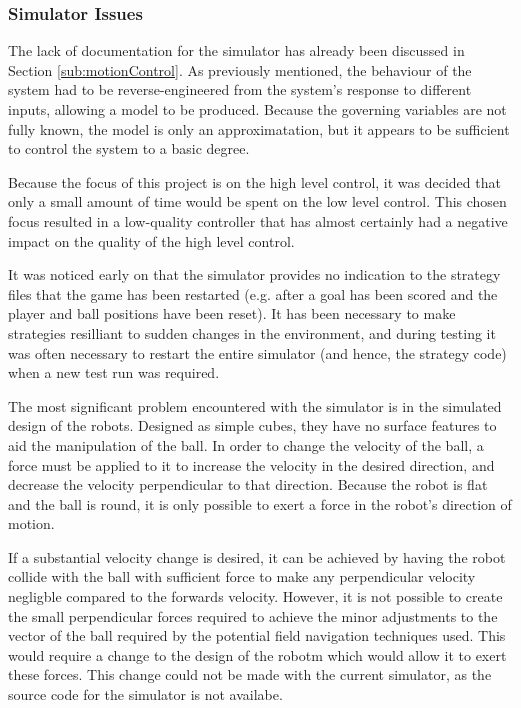 \documentclass[10pt]{article}
\begin{document}
\subsubsection{Simulator Issues\label{sub:simulatorIssues}}

The lack of documentation for the simulator has already been discussed in
Section \ref{sub:motionControl}.  As previously mentioned, the behaviour of the
system had to be reverse-engineered from the system's response to different
inputs, allowing a model to be produced.  Because the governing variables are
not fully known, the model is only an approximatation, but it appears to be
sufficient to control the system to a basic degree.

Because the focus of this project is on the high level control, it was decided
that only a small amount of time would be spent on the low level control.  This
chosen focus resulted in a low-quality controller that has almost certainly had
a negative impact on the quality of the high level control.

It was noticed early on that the simulator provides no indication to the
strategy files that the game has been restarted (e.g. after a goal has been
scored and the player and ball positions have been reset).  It has been
necessary to make strategies resilliant to sudden changes in the environment,
and during testing it was often necessary to restart the entire simulator (and
hence, the strategy code) when a new test run was required.

The most significant problem encountered with the simulator is in the simulated
design of the robots.  Designed as simple cubes, they have no surface features
to aid the manipulation of the ball.  In order to change the velocity of the
ball, a force must be applied to it to increase the velocity in the desired
direction, and decrease the velocity perpendicular to that direction.  Because
the robot is flat and the ball is round, it is only possible to exert a force in
the robot's direction of motion.

If a substantial velocity change is desired, it can be achieved by having the
robot collide with the ball with sufficient force to make any perpendicular
velocity negligble compared to the forwards velocity.  However, it is not
possible to create the small perpendicular forces required to achieve the minor
adjustments to the vector of the ball required by the potential field navigation
techniques used. This would require a change to the design of the robotm which
would allow it to exert these forces.  This change could not be made with the
current simulator, as the source code for the simulator is not availabe.
\end{document}

